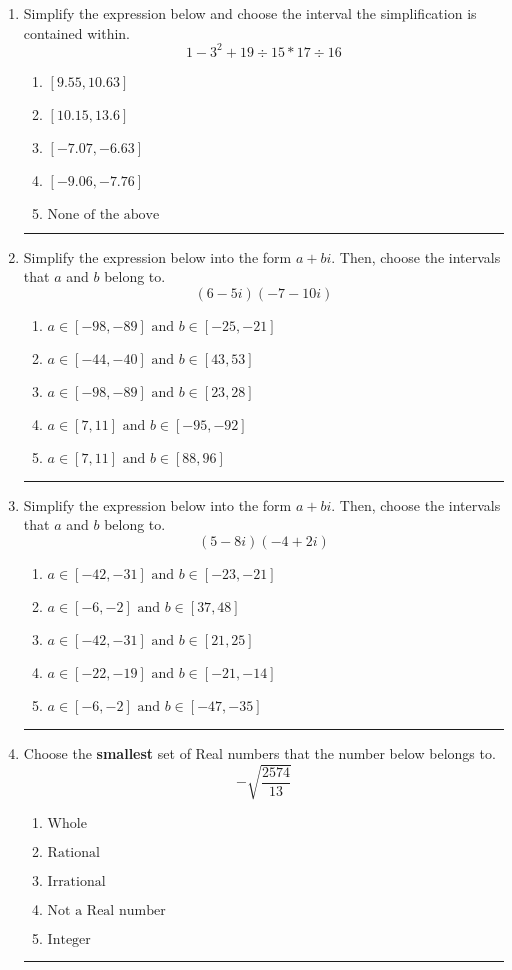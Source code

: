 \documentclass[14pt]{extbook}
\newcommand{\litem}[1]{\item#1\hspace*{-1cm}\rule{\textwidth}{0.4pt}}
\begin{document}
\begin{enumerate}
{\begin{enumerate}[label=\Alph*.]
\end{enumerate} }
\litem{
Simplify the expression below and choose the interval the simplification is contained within.\[ 1 - 3^2 + 19 \div 15 * 17 \div 16 \]\begin{enumerate}[label=\Alph*.]
\item \( [9.55, 10.63] \)
\item \( [10.15, 13.6] \)
\item \( [-7.07, -6.63] \)
\item \( [-9.06, -7.76] \)
\item \( \text{None of the above} \)

\end{enumerate} }
\litem{
Simplify the expression below into the form $a+bi$. Then, choose the intervals that $a$ and $b$ belong to.\[ (6 - 5 i)(-7 - 10 i) \]\begin{enumerate}[label=\Alph*.]
\item \( a \in [-98, -89] \text{ and } b \in [-25, -21] \)
\item \( a \in [-44, -40] \text{ and } b \in [43, 53] \)
\item \( a \in [-98, -89] \text{ and } b \in [23, 28] \)
\item \( a \in [7, 11] \text{ and } b \in [-95, -92] \)
\item \( a \in [7, 11] \text{ and } b \in [88, 96] \)

\end{enumerate} }
\litem{
Simplify the expression below into the form $a+bi$. Then, choose the intervals that $a$ and $b$ belong to.\[ (5 - 8 i)(-4 + 2 i) \]\begin{enumerate}[label=\Alph*.]
\item \( a \in [-42, -31] \text{ and } b \in [-23, -21] \)
\item \( a \in [-6, -2] \text{ and } b \in [37, 48] \)
\item \( a \in [-42, -31] \text{ and } b \in [21, 25] \)
\item \( a \in [-22, -19] \text{ and } b \in [-21, -14] \)
\item \( a \in [-6, -2] \text{ and } b \in [-47, -35] \)

\end{enumerate} }
\litem{
Choose the \textbf{smallest} set of Real numbers that the number below belongs to.\[ -\sqrt{\frac{2574}{13}} \]\begin{enumerate}[label=\Alph*.]
\item \( \text{Whole} \)
\item \( \text{Rational} \)
\item \( \text{Irrational} \)
\item \( \text{Not a Real number} \)
\item \( \text{Integer} \)


\end{enumerate}}
\end{enumerate}
\end{document}
